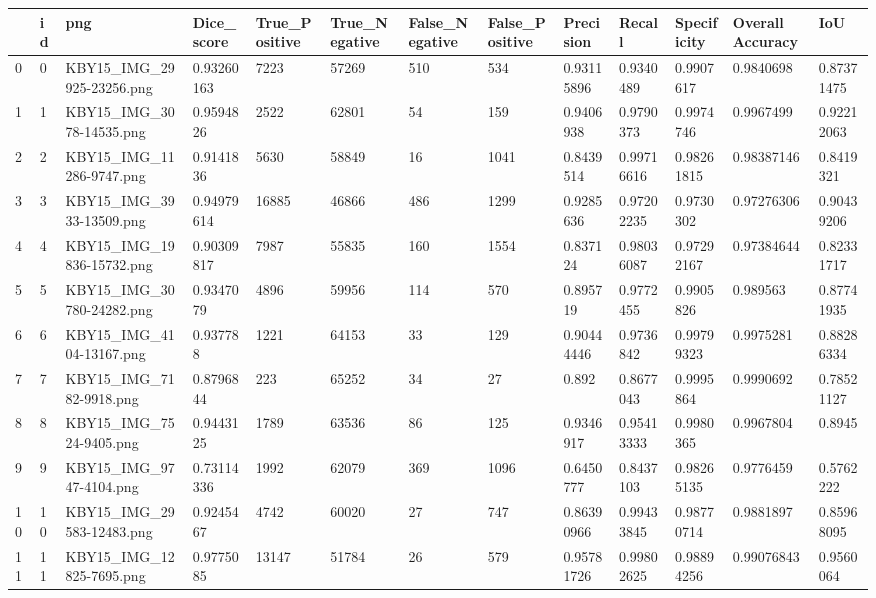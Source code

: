 \documentclass[11pt, a4paper, twoside]{report}
\begin{document}
\begin{longtable}[c]{@{}lllllllllllll@{}}
\toprule
 & id & png & Dice\_score & True\_Positive & True\_Negative & False\_Negative & False\_Positive & Precision & Recall & Specificity & Overall Accuracy & IoU \\* \midrule
\endhead
%
\bottomrule
\endfoot
%
\endlastfoot
%
0 & 0 & KBY15\_IMG\_29925-23256.png & 0.93260163 & 7223 & 57269 & 510 & 534 & 0.93115896 & 0.9340489 & 0.9907617 & 0.9840698 & 0.87371475 \\
1 & 1 & KBY15\_IMG\_3078-14535.png & 0.9594826 & 2522 & 62801 & 54 & 159 & 0.9406938 & 0.9790373 & 0.9974746 & 0.9967499 & 0.92212063 \\
2 & 2 & KBY15\_IMG\_11286-9747.png & 0.9141836 & 5630 & 58849 & 16 & 1041 & 0.8439514 & 0.99716616 & 0.98261815 & 0.98387146 & 0.8419321 \\
3 & 3 & KBY15\_IMG\_3933-13509.png & 0.94979614 & 16885 & 46866 & 486 & 1299 & 0.9285636 & 0.97202235 & 0.9730302 & 0.97276306 & 0.90439206 \\
4 & 4 & KBY15\_IMG\_19836-15732.png & 0.90309817 & 7987 & 55835 & 160 & 1554 & 0.837124 & 0.98036087 & 0.97292167 & 0.97384644 & 0.82331717 \\
5 & 5 & KBY15\_IMG\_30780-24282.png & 0.9347079 & 4896 & 59956 & 114 & 570 & 0.895719 & 0.9772455 & 0.9905826 & 0.989563 & 0.87741935 \\
6 & 6 & KBY15\_IMG\_4104-13167.png & 0.937788 & 1221 & 64153 & 33 & 129 & 0.90444446 & 0.9736842 & 0.99799323 & 0.9975281 & 0.88286334 \\
7 & 7 & KBY15\_IMG\_7182-9918.png & 0.8796844 & 223 & 65252 & 34 & 27 & 0.892 & 0.8677043 & 0.9995864 & 0.9990692 & 0.78521127 \\
8 & 8 & KBY15\_IMG\_7524-9405.png & 0.9443125 & 1789 & 63536 & 86 & 125 & 0.9346917 & 0.95413333 & 0.9980365 & 0.9967804 & 0.8945 \\
9 & 9 & KBY15\_IMG\_9747-4104.png & 0.73114336 & 1992 & 62079 & 369 & 1096 & 0.6450777 & 0.8437103 & 0.98265135 & 0.9776459 & 0.5762222 \\
10 & 10 & KBY15\_IMG\_29583-12483.png & 0.9245467 & 4742 & 60020 & 27 & 747 & 0.86390966 & 0.99433845 & 0.98770714 & 0.9881897 & 0.85968095 \\
11 & 11 & KBY15\_IMG\_12825-7695.png & 0.9775085 & 13147 & 51784 & 26 & 579 & 0.95781726 & 0.99802625 & 0.98894256 & 0.99076843 & 0.9560064 \\

\end{longtable}
\end{document}
